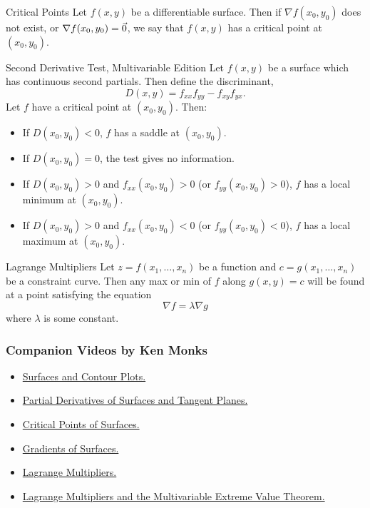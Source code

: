  \begin{definition}{Critical Points}
Let $f(x,y)$ be a differentiable surface. Then if $\nabla f(x_0,y_0)$ does not exist, or $\nabla f(x_0,y_0)=\vec{0}$, we say that $f(x,y)$ has a critical point at $(x_0,y_0)$.
\end{definition}

\begin{definition}{Second Derivative Test, Multivariable Edition}
Let $f(x,y)$ be a surface which has continuous second partials. Then define the discriminant, $$D(x,y)=f_{xx}f_{yy}-f_{xy}f_{yx}.$$ Let $f$ have a critical point at $(x_0,y_0)$. Then:
\vspace{1em}
\begin{itemize}
\item If $D(x_0,y_0)<0$, $f$ has a saddle at $(x_0,y_0)$.
\vspace{1em}
\item If $D(x_0,y_0)=0$, the test gives no information.
\vspace{1em}
\item If $D(x_0,y_0)>0$ and $f_{xx}(x_0,y_0)>0$ (or $f_{yy}(x_0,y_0)>0$), $f$ has a local minimum at $(x_0,y_0)$.
\vspace{1em}
\item If $D(x_0,y_0)>0$ and $f_{xx}(x_0,y_0)<0$ (or $f_{yy}(x_0,y_0)<0$), $f$ has a local maximum at $(x_0,y_0)$.
\end{itemize}
\end{definition}

\begin{theorem}{Lagrange Multipliers}
Let $z=f(x_1,\ldots, x_n)$ be a function and $c=g(x_1,\ldots,x_n)$ be a constraint curve. Then any max or min of $f$ along $g(x,y)=c$ will be found at a point satisfying the equation $$\nabla f=\lambda \nabla g $$ where $\lambda$ is some constant.
\end{theorem}

\subsubsection*{Companion Videos by Ken Monks}
\begin{itemize}
\item \href{https://www.youtube.com/watch?v=7M0O_Y88wYM}{Surfaces and Contour Plots.}
\item \href{https://www.youtube.com/watch?v=LmDz71ssyEA}{Partial Derivatives of Surfaces and Tangent Planes.}
\item \href{https://www.youtube.com/watch?v=rNK0GXjsjEg}{Critical Points of Surfaces.}
\item \href{https://www.youtube.com/watch?v=ontRtIlXu3A}{Gradients of Surfaces.}
\item \href{https://www.youtube.com/watch?v=26h_eWSdcrA}{Lagrange Multipliers.}
\item \href{https://www.youtube.com/watch?v=JVnyQUNnuSU}{Lagrange Multipliers and the Multivariable Extreme Value Theorem.}
\end{itemize}

\renewcommand\thesubsection{\thesection.\arabic{subsection}}